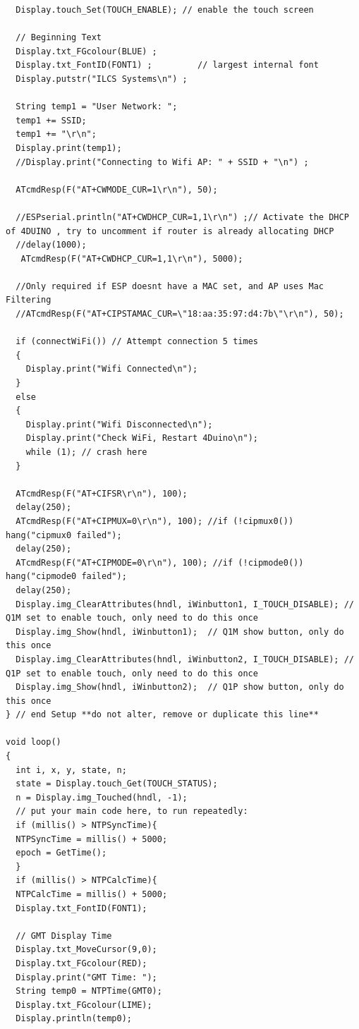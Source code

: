 \documentclass[12pt,a4paper]{report}
\begin{document}
\begin{lstlisting}
  Display.touch_Set(TOUCH_ENABLE); // enable the touch screen

  // Beginning Text
  Display.txt_FGcolour(BLUE) ;
  Display.txt_FontID(FONT1) ;         // largest internal font
  Display.putstr("ILCS Systems\n") ;

  String temp1 = "User Network: ";
  temp1 += SSID;
  temp1 += "\r\n";
  Display.print(temp1);
  //Display.print("Connecting to Wifi AP: " + SSID + "\n") ;

  ATcmdResp(F("AT+CWMODE_CUR=1\r\n"), 50);

  //ESPserial.println("AT+CWDHCP_CUR=1,1\r\n") ;// Activate the DHCP of 4DUINO , try to uncomment if router is already allocating DHCP
  //delay(1000);
   ATcmdResp(F("AT+CWDHCP_CUR=1,1\r\n"), 5000);

  //Only required if ESP doesnt have a MAC set, and AP uses Mac Filtering
  //ATcmdResp(F("AT+CIPSTAMAC_CUR=\"18:aa:35:97:d4:7b\"\r\n"), 50);

  if (connectWiFi()) // Attempt connection 5 times
  {
    Display.print("Wifi Connected\n");
  }
  else
  {
    Display.print("Wifi Disconnected\n");
    Display.print("Check WiFi, Restart 4Duino\n");
    while (1); // crash here
  }

  ATcmdResp(F("AT+CIFSR\r\n"), 100);
  delay(250);
  ATcmdResp(F("AT+CIPMUX=0\r\n"), 100); //if (!cipmux0()) hang("cipmux0 failed");
  delay(250);
  ATcmdResp(F("AT+CIPMODE=0\r\n"), 100); //if (!cipmode0()) hang("cipmode0 failed");
  delay(250);
  Display.img_ClearAttributes(hndl, iWinbutton1, I_TOUCH_DISABLE); // Q1M set to enable touch, only need to do this once
  Display.img_Show(hndl, iWinbutton1);  // Q1M show button, only do this once
  Display.img_ClearAttributes(hndl, iWinbutton2, I_TOUCH_DISABLE); // Q1P set to enable touch, only need to do this once
  Display.img_Show(hndl, iWinbutton2);  // Q1P show button, only do this once
} // end Setup **do not alter, remove or duplicate this line**

void loop()
{
  int i, x, y, state, n;
  state = Display.touch_Get(TOUCH_STATUS);
  n = Display.img_Touched(hndl, -1);
  // put your main code here, to run repeatedly:
  if (millis() > NTPSyncTime){
  NTPSyncTime = millis() + 5000;
  epoch = GetTime();
  }
  if (millis() > NTPCalcTime){
  NTPCalcTime = millis() + 5000;
  Display.txt_FontID(FONT1);

  // GMT Display Time
  Display.txt_MoveCursor(9,0);
  Display.txt_FGcolour(RED);
  Display.print("GMT Time: ");
  String temp0 = NTPTime(GMT0);
  Display.txt_FGcolour(LIME);
  Display.println(temp0);


\end{lstlisting}
\end{document}
